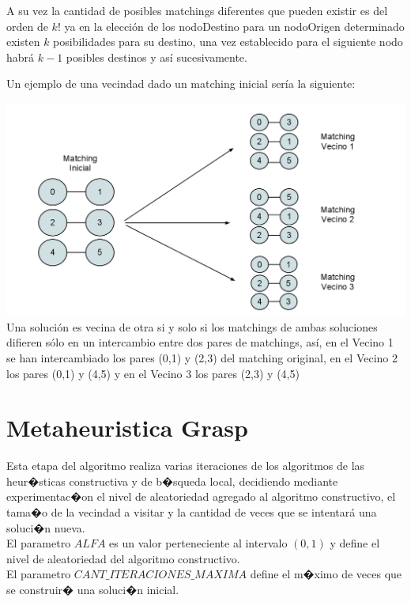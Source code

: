 \documentclass[11pt, a4paper, spanish]{article}
\begin{document}
A su vez la cantidad de posibles matchings diferentes que pueden existir es del orden de $k!$ ya en la elecci\'on de los nodoDestino para un nodoOrigen determinado existen $k$ posibilidades para su destino, una vez establecido para el siguiente nodo habr\'a $k-1$ posibles destinos y as\'i sucesivamente.

\newpage
Un ejemplo de una vecindad dado un matching inicial ser\'ia la siguiente:

\begin{center}
\centering \includegraphics[scale=0.30]{img/MatchingVecindad.png}\\
\small{Una soluci\'on es vecina de otra si y solo si los matchings de ambas soluciones difieren s\'olo en un intercambio entre dos pares de matchings, as\'i, en el Vecino 1 se han intercambiado los pares (0,1) y (2,3) del matching original, en el Vecino 2 los pares (0,1) y (4,5) y en el Vecino 3 los pares (2,3) y (4,5)}
\end{center}

\newpage
\section{Metaheuristica Grasp}

Esta etapa del algoritmo realiza varias iteraciones de los algoritmos de las heur�sticas constructiva y de b�squeda local, decidiendo mediante experimentac�on el nivel de aleatoriedad agregado al algoritmo constructivo, el tama�o de la vecindad a visitar y la cantidad de veces que se intentar\'a una soluci�n nueva.\\
\noindent El parametro $ALFA$ es un valor perteneciente al intervalo $(0,1)$ y define el nivel de aleatoriedad del algoritmo constructivo.\\

\noindent El parametro $CANT\_ITERACIONES\_MAXIMA$ define el m�ximo de veces que se construir� una soluci�n inicial.\\
\end{document}
